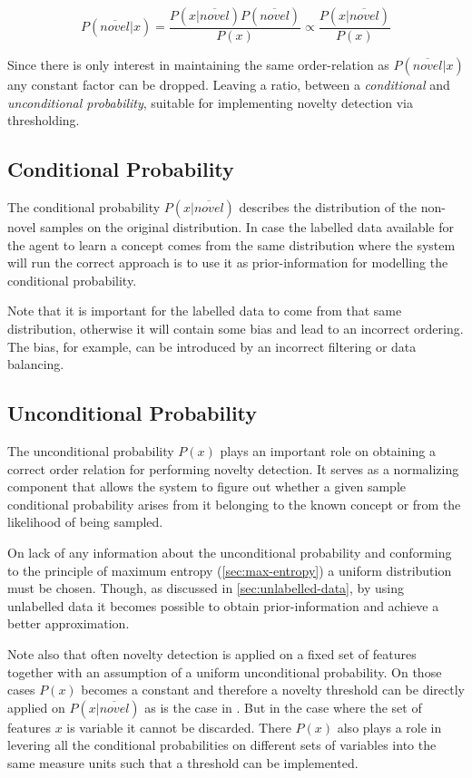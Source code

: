 \begin{equation}
\label{eq:novelty-ratio}
          P(\overline{novel}|x)
  =       \frac{P(x|\overline{novel}) P(\overline{novel})}{P(x)}
  \propto \frac{P(x|\overline{novel})}{P(x)}
\end{equation}

Since there is only interest in maintaining the same order-relation as
$P(\overline{novel}|x)$ any constant factor can be dropped.
Leaving a ratio, between a \emph{conditional} and
\emph{unconditional probability}, suitable for implementing novelty detection
via thresholding.


\subsection{Conditional Probability}
The conditional probability $P(x|\overline{novel})$ describes the distribution
of the non-novel samples on the original distribution. In case the labelled data
available for the agent to learn a concept comes from the same distribution
where the system will run the correct approach is to use it as prior-information
for modelling the conditional probability.

Note that it is important for the labelled data to come from that same
distribution, otherwise it will contain some bias and lead to an incorrect
ordering. The bias, for example, can be introduced by an incorrect filtering or
data balancing.

\subsection{Unconditional Probability}
The unconditional probability $P(x)$ plays an important role on obtaining a
correct order relation for performing novelty detection.
It serves as a normalizing component that allows the system to figure out
whether a given sample conditional probability arises from it belonging to
the known concept or from the likelihood of being sampled.


On lack of any information about the unconditional probability and conforming to
the principle of maximum entropy (\autoref{sec:max-entropy}) a uniform
distribution must be chosen.
Though, as discussed in \autoref{sec:unlabelled-data}, by using unlabelled data
it becomes possible to obtain prior-information and achieve a better
approximation.


Note also that often novelty detection is applied on a fixed set of features
together with an assumption of a uniform unconditional probability.
On those cases $P(x)$ becomes a constant and therefore a novelty threshold
can be directly applied on $P(x|\overline{novel})$ as is the case in \cite{bishop1994novelty}.
But in the case where the set of features $x$ is variable it cannot be
discarded. There $P(x)$ also plays a role in levering all the conditional
probabilities on different sets of variables into the same measure units
such that a threshold can be implemented.



